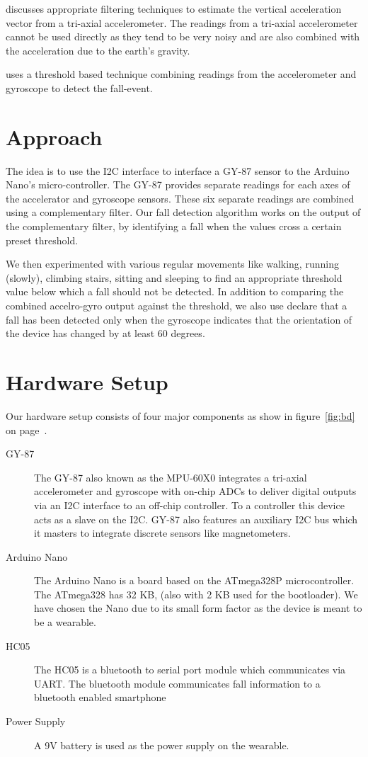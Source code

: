 \documentclass[11pt, a4paper]{article}
\begin{document}
\noindent \cite{Bourke2011} discusses appropriate filtering techniques to
estimate the vertical acceleration vector from a tri-axial accelerometer. The
readings from a tri-axial accelerometer cannot be used directly as they tend
to be very noisy and are also combined with the acceleration due to the
earth's gravity.

\noindent \cite{Wu2015} uses a threshold based technique combining readings
from the accelerometer and gyroscope to detect the fall-event.

\section{Approach}
The idea is to use the I2C interface to interface a GY-87 sensor to the
Arduino Nano's micro-controller. The GY-87 provides separate readings for each
axes of the accelerator and gyroscope sensors. These six separate readings are
combined using a complementary filter. Our fall detection algorithm works on
the output of the complementary filter, by identifying a fall when the values
cross a certain preset threshold.

\noindent We then experimented with various regular movements like walking,
running (slowly), climbing stairs, sitting and sleeping to find an appropriate
threshold value below which a fall should not be detected. In addition to
comparing the combined accelro-gyro output against the threshold, we also use
declare that a fall has been detected only when the gyroscope indicates that
the orientation of the device has changed by at least 60 degrees.

\section{Hardware Setup}
Our hardware setup consists of four major components as show in
figure~\ref{fig:bd} on page~\pageref{fig:bd}.

\begin{description}
   \item [GY-87] The GY-87 also known as the MPU-60X0 integrates a
      tri-axial accelerometer and gyroscope with on-chip ADCs to deliver
      digital outputs via an I2C interface to an off-chip controller. To
      a controller this device acts as a slave on the I2C. GY-87 also
      features an auxiliary I2C bus which it masters to integrate
      discrete sensors like magnetometers.

   \item [Arduino Nano] The Arduino Nano is a board based on the
      ATmega328P microcontroller. The ATmega328 has 32 KB, (also with 2
      KB used for the bootloader). We have chosen the Nano due to its
      small form factor as the device is meant to be a wearable.

   \item [HC05] The HC05 is a bluetooth to serial port module which
      communicates via UART. The bluetooth module communicates fall
      information to a bluetooth enabled smartphone

   \item [Power Supply] A 9V battery is used as the power supply on the
      wearable.
\end{description}
\end{document}
